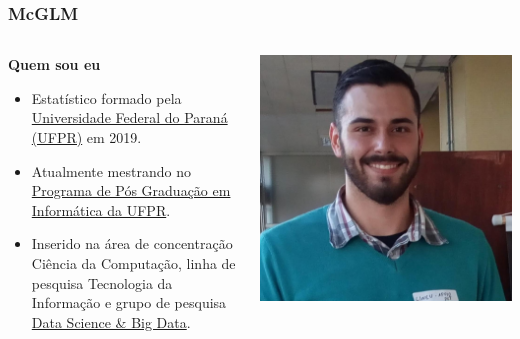\documentclass[10pt,
  aspectratio=169,
  serif,
  mathserif,
  professionalfont,
  compress,
  handout,
  ]{beamer}\usepackage[]{graphicx}\usepackage[]{color}
\begin{document}
\begin{frame}

  \frametitle{McGLM}

\begin{columns}
\begin{column}{0.7\textwidth}
   
   \textbf{Quem sou eu}
   
   \begin{itemize}

  \item Estatístico formado pela \href{https://www.ufpr.br/portalufpr/}{Universidade Federal do Paraná (UFPR)} em 2019.

  \item Atualmente mestrando no \href{http://www.prppg.ufpr.br/ppginformatica/?lang=pb}{Programa de Pós Graduação em Informática da UFPR}.
  
  \item Inserido na área de concentração Ciência da Computação, linha de pesquisa Tecnologia da Informação e grupo de pesquisa \href{https://web.inf.ufpr.br/dsbd/}{Data Science \& Big Data}.
  
  \end{itemize}
  
\end{column}
\begin{column}{0.3\textwidth}  %
    \begin{center}
     \includegraphics[width=\textwidth]{img/eu3.jpeg}
     \end{center}
\end{column}
\end{columns}
\end{frame}
\end{document}
